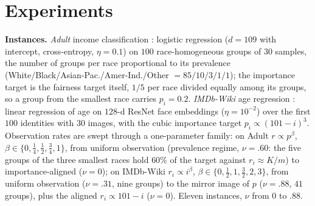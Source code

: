 \section{Experiments}
\label{sec:exp}

\noindent\textbf{Instances.}
\emph{Adult} income classification \cite{uci_adult}: logistic regression
($d{=}109$ with intercept, cross-entropy, $\eta{=}0.1$) on $100$
race-homogeneous groups of $30$ samples, the number of groups per race
proportional to its prevalence (White/Black/Asian-Pac./Amer-Ind./Other
$=85/10/3/1/1$); the importance target is the fairness target itself, $1/5$
per race divided equally among its groups, so a group from the smallest
race carries $p_i=0.2$. \emph{IMDb-Wiki} age regression
\cite{rothe2018imdbwiki}: linear regression of age on $128$-d ResNet face
embeddings ($\eta{=}10^{-2}$) over the first $100$ identities with $30$
images, with the cubic importance target $p_i\propto(101-i)^3$.
Observation rates are swept through a one-parameter family: on Adult
$r\propto p^{\beta}$, $\beta\in\{0,\tfrac14,\tfrac12,\tfrac34,1\}$, from
uniform observation (prevalence regime, $\nu{=}.60$: the five groups of the
three smallest races hold $60\%$ of the target against $r_i\approx K/m$)
to importance-aligned ($\nu{=}0$); on IMDb-Wiki $r_i\propto i^{\beta}$,
$\beta\in\{0,\tfrac12,1,\tfrac32,2,3\}$, from uniform observation
($\nu{=}.31$, nine groups) to the mirror image of $p$ ($\nu{=}.88$, $41$
groups), plus the aligned $r_i\propto 101-i$ ($\nu{=}0$). Eleven instances,
$\nu$ from $0$ to $.88$.

